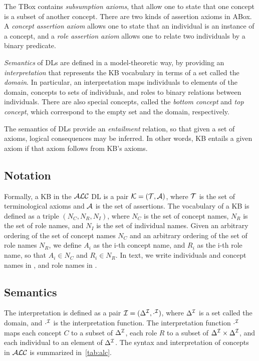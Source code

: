 The TBox contains \emph{subsumption axioms}, that allow one to state that one concept is a subset of another concept.
There are two kinds of assertion axioms in ABox.
A \emph{concept assertion axiom} allows one to state that an individual is an instance of a concept, and a \emph{role assertion axiom} allows one to relate two individuals by a binary predicate.

\emph{Semantics} of DLs are defined in a model-theoretic way, by providing an \emph{interpretation} that represents the KB vocabulary in terms of a set called the \emph{domain}.
In particular, an interpretation maps individuals to elements of the domain, concepts to sets of individuals, and roles to binary relations between individuals.
There are also special concepts, called the \emph{bottom concept} and \emph{top concept}, which correspond to the empty set and the domain, respectively.

The semantics of DLs provide an \emph{entailment} relation, so that given a set of axioms, logical consequences may be inferred.
In other words, KB entails a given axiom if that axiom follows from KB's axioms.


\subsection{Notation}

Formally, a KB in the $\mathcal{ALC}$ DL is a pair $\mathcal{K} = (\mathcal{T}, \mathcal{A})$, where $\mathcal{T}$ is the set of terminological axioms and $\mathcal{A}$ is the set of assertions.
The vocabulary of a KB is defined as a triple $(N_C, N_R, N_I)$, where $N_C$ is the set of {concept names}, $N_R$ is the set of {role names}, and $N_I$ is the set of {individual names}.
Given an arbitrary ordering of the set of concept names $N_C$ and an arbitrary ordering of the set of role names $N_R$, we define $A_i$ as the i-th concept name, and $R_i$ as the i-th role name, so that $A_i \in N_C$ and $R_i \in N_R$.
In text, we write individuals and concept names in , and role names in .

\subsection{Semantics}

The interpretation is defined as a pair $\mathcal{I} = (\Delta^\mathcal{I}, \cdot^{\mathcal{I}})$, where $\Delta^\mathcal{I}$ is a set called the domain, and $\cdot^{\mathcal{I}}$ is the interpretation function.
The interpretation function $\cdot^{\mathcal{I}}$ maps each concept $C$ to a subset of $\Delta^\mathcal{I}$, each role $R$ to a subset of $\Delta^\mathcal{I} \times \Delta^\mathcal{I}$, and each individual to an element of $\Delta^\mathcal{I}$.
The syntax and interpretation of concepts in $\mathcal{ALC}$ is summarized in~\autoref{tab:alc}.

